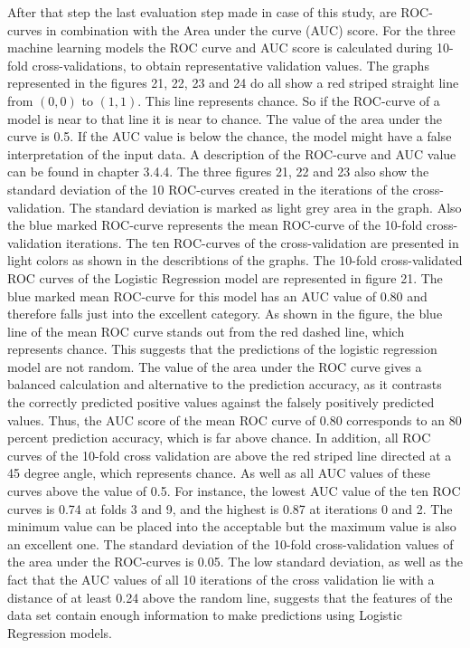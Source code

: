 \documentclass[../masterarbeit.tex]{subfiles}
\begin{document}
After that step the last evaluation step made in case of this study, are ROC-curves in combination with the Area under the curve (AUC) score. For the three machine learning models the ROC curve and AUC score is calculated during 10-fold cross-validations, to obtain representative validation values. The graphs represented in the figures 21, 22, 23 and 24 do all show a red striped straight line from \((0,0)\) to \((1,1)\). This line represents chance. So if the ROC-curve of a model is near to that line it is near to chance. The value of the area under the curve is 0.5. If the AUC value is below the chance, the model might have a false interpretation of the input data. A description of the ROC-curve and AUC value can be found in chapter 3.4.4. 
The three figures 21, 22 and 23 also show the standard deviation of the 10 ROC-curves created in the iterations of the cross-validation. The standard deviation is marked as light grey area in the graph.
Also the blue marked ROC-curve represents the mean ROC-curve of the 10-fold cross-validation iterations.
The ten ROC-curves of the cross-validation are presented in light colors as shown in the describtions of the graphs.
The 10-fold cross-validated ROC curves of the Logistic Regression model are represented in figure 21. The blue marked mean ROC-curve for this model has an AUC value of 0.80 and therefore falls just into the excellent category. As shown in the figure, the blue line of the mean ROC curve stands out from the red dashed line, which represents chance. This suggests that the predictions of the logistic regression model are not random. The value of the area under the ROC curve gives a balanced calculation and alternative to the prediction accuracy, as it contrasts the correctly predicted positive values against the falsely positively predicted values. Thus, the AUC score of the mean ROC curve of 0.80 corresponds to an 80 percent prediction accuracy, which is far above chance. In addition, all ROC curves of the 10-fold cross validation are above the red striped line directed at a 45 degree angle, which represents chance.  As well as all AUC values of these curves above the value of 0.5. For instance, the lowest AUC value of the ten ROC curves is 0.74 at folds 3 and 9, and the highest is 0.87 at iterations 0 and 2. The minimum value can be placed into the acceptable but the maximum value is also an excellent one. The standard deviation of the 10-fold cross-validation values of the area under the ROC-curves is  0.05. The low standard deviation, as well as the fact that the AUC values of all 10 iterations of the cross validation lie with a distance of at least 0.24 above the random line, suggests that the features of the data set contain enough information to make predictions using Logistic Regression models. \\
 
\end{document}
